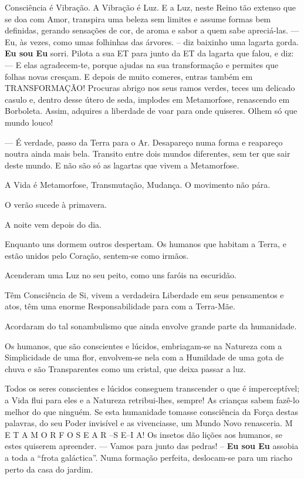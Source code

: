 Consciência é Vibração. A Vibração é Luz. E a Luz, neste Reino tão extenso que se doa com Amor, transpira uma beleza sem limites e assume formas bem definidas, gerando sensações de cor, de aroma e sabor a quem sabe apreciá-las.
\bigbreak
— Eu, às vezes, como umas folhinhas das árvores. – diz baixinho uma lagarta gorda.
\textbf{Eu sou Eu} sorri. Pilota a sua ET para junto da ET da lagarta que falou, e diz:
\bigbreak
— E elas agradecem-te, porque ajudas na sua transformação e permites que folhas novas cresçam. E depois de muito comeres, entras também em TRANSFORMAÇÃO! Procuras abrigo nos seus ramos verdes, teces um delicado casulo e, dentro desse útero de seda, implodes em Metamorfose, renascendo em Borboleta. Assim, adquires a liberdade de voar para onde quiseres. Olhem só que mundo louco!

— É verdade, passo da Terra para o Ar. Desapareço numa forma e reapareço noutra ainda mais bela. Transito entre dois mundos diferentes, sem ter que sair deste mundo.
\bigbreak
E não são só as lagartas que vivem a Metamorfose.

A Vida é Metamorfose, Transmutação, Mudança.
O movimento não pára.

O verão sucede à primavera.

A noite vem depois do dia.

Enquanto uns dormem outros despertam.
\bigbreak
Os humanos que habitam a Terra, e estão unidos pelo Coração, sentem-se como irmãos.

Acenderam uma Luz no seu peito, como uns faróis na escuridão.

Têm Consciência de Si, vivem a verdadeira Liberdade em seus pensamentos e atos, têm uma enorme Responsabilidade para com a Terra-Mãe.

Acordaram do tal sonambulismo que ainda envolve grande parte da humanidade.

Os humanos, que são conscientes e lúcidos, embriagam-se na Natureza com a Simplicidade de uma flor, envolvem-se nela com a Humildade de uma gota de chuva e são Transparentes como um cristal, que deixa passar a luz.

Todos os seres conscientes e lúcidos conseguem transcender o que é imperceptível; a Vida flui para eles e a Natureza retribui-lhes, sempre!
As crianças sabem fazê-lo melhor do que ninguém.
\bigbreak
Se esta humanidade tomasse consciência da Força destas palavras, do seu Poder invisível e as vivenciasse, um Mundo Novo renasceria.
\bigbreak
M E T A M O R F O S E A R –S E–I A!
\bigbreak
Os insetos dão lições aos humanos, se estes quiserem apreender.
\bigbreak
— Vamos para junto das pedras! – \textbf{Eu sou Eu} assobia a toda a “frota galáctica”.
\bigbreak
Numa formação perfeita, deslocam-se para um riacho perto da casa do jardim.

